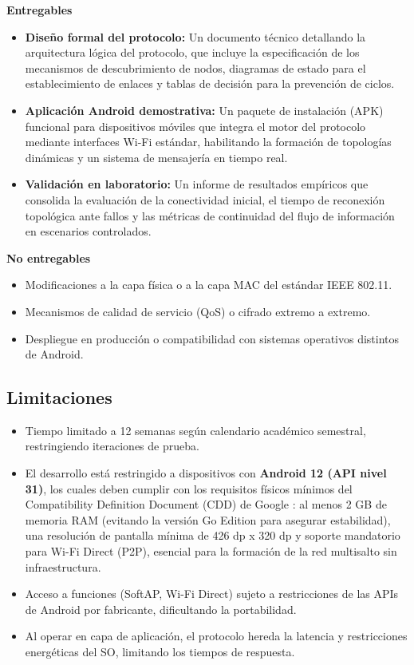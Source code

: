 \documentclass[12pt,oneside]{scrreprt}
\begin{document}
\textbf{Entregables}
\begin{itemize}
    \item \textbf{Diseño formal del protocolo:} Un documento técnico detallando la arquitectura lógica del protocolo, que incluye la especificación de los mecanismos de descubrimiento de nodos, diagramas de estado para el establecimiento de enlaces y tablas de decisión para la prevención de ciclos.
    \item \textbf{Aplicación Android demostrativa:} Un paquete de instalación (APK) funcional para dispositivos móviles que integra el motor del protocolo mediante interfaces Wi-Fi estándar, habilitando la formación de topologías dinámicas y un sistema de mensajería en tiempo real.
    \item \textbf{Validación en laboratorio:} Un informe de resultados empíricos que consolida la evaluación de la conectividad inicial, el tiempo de reconexión topológica ante fallos y las métricas de continuidad del flujo de información en escenarios controlados.
\end{itemize}

\textbf{No entregables}
\begin{itemize}
    \item Modificaciones a la capa física o a la capa MAC del estándar IEEE 802.11.
    \item Mecanismos de calidad de servicio (QoS) o cifrado extremo a extremo.
    \item Despliegue en producción o compatibilidad con sistemas operativos distintos de Android.
\end{itemize}

\subsection{Limitaciones}

\begin{itemize}
    \item Tiempo limitado a 12 semanas según calendario académico semestral, restringiendo iteraciones de prueba.
    \item El desarrollo está restringido a dispositivos con \textbf{Android 12 (API nivel 31)}, los cuales deben cumplir con los requisitos físicos mínimos del Compatibility Definition Document (CDD) de Google \parencite{Google2021}: al menos 2 GB de memoria RAM (evitando la versión Go Edition para asegurar estabilidad), una resolución de pantalla mínima de 426 dp x 320 dp y soporte mandatorio para Wi-Fi Direct (P2P), esencial para la formación de la red multisalto sin infraestructura.
    \item Acceso a funciones (SoftAP, Wi-Fi Direct) sujeto a restricciones de las APIs de Android por fabricante, dificultando la portabilidad.
    \item Al operar en capa de aplicación, el protocolo hereda la latencia y restricciones energéticas del SO, limitando los tiempos de respuesta.
\end{itemize}
\end{document}

